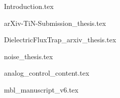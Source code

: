 





\begin{frontmatter}










\cleardoublepage
{}
\begin{singlespace}
\tableofcontents
\end{singlespace}

\end{frontmatter}

\pagestyle{plain} %

%

{Introduction.tex}

{arXiv-TiN-Submission_thesis.tex}

{DielectricFluxTrap_arxiv_thesis.tex}

{noise_thesis.tex}

{analog_control_content.tex}

{mbl_manuscript_v6.tex}



%
%
\printbibliography


